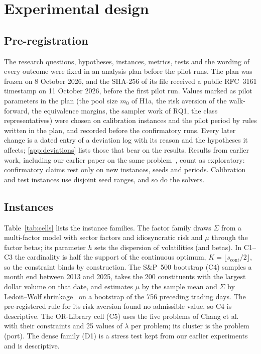 \section{Experimental design}\label{sec:design}

\subsection{Pre-registration}\label{sec:prereg}

The research questions, hypotheses, instances, metrics, tests and the wording of every outcome were fixed in an
analysis plan before the pilot runs. The plan was frozen on 8 October 2026, and the SHA-256 of its file received a
public RFC~3161 timestamp on 11 October 2026, before the first pilot run. Values marked as pilot parameters in the plan
(the pool size $m_0$ of H1a, the risk aversion of the walk-forward, the equivalence margins, the sampler work of RQ1,
the class representatives) were chosen on calibration instances and the pilot period by rules written in the plan,
and recorded before the confirmatory runs. Every later change is a dated entry of a deviation log with its reason and
the hypotheses it affects; \ref{app:deviations} lists those that bear on the results. Results from earlier
work, including our earlier paper on the same problem~\cite{avdoshin2026discrete},
count as exploratory: confirmatory claims rest only
on new instances, seeds and periods. Calibration and test instances use disjoint seed ranges, and so do the solvers.

\subsection{Instances}\label{sec:instances}

Table~\ref{tab:cells} lists the instance families. The factor family draws $\Sigma$ from a multi-factor model with
sector factors and idiosyncratic risk and $\mu$ through the factor betas; its parameter $h$ sets the dispersion of
volatilities (and betas). In C1--C3 the cardinality is half the support of the continuous optimum,
$K = \lfloor s_{\mathrm{cont}}/2 \rfloor$, so the constraint binds by construction. The S\&P~500 bootstrap (C4) samples a
month end between 2013 and 2025, takes the 200 constituents with the largest dollar volume on that date, and estimates
$\mu$ by the sample mean and $\Sigma$ by Ledoit--Wolf shrinkage~\cite{ledoit2004wellconditioned} on a bootstrap of the
756 preceding trading days. The pre-registered rule for its risk aversion found no admissible value, so C4 is
descriptive. The OR-Library cell (C5) uses the five problems of Chang et al.~\cite{chang2000heuristics} with their
constraints and 25 values of $\lambda$ per problem; its cluster is the problem (port). The dense family (D1) is a
stress test kept from our earlier experiments and is descriptive.

